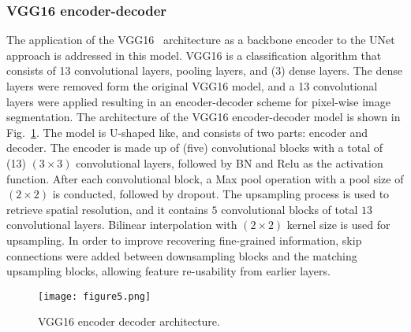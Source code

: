 \subsubsection{VGG16 encoder-decoder}
The application of the VGG16~\cite{Simonyan2015} architecture as a backbone encoder to the UNet~\cite{Ronneberger2015} approach is addressed in this model.
VGG16 is a classification algorithm that consists of 13 convolutional layers, pooling layers, and (3) dense layers.
The dense layers were removed form the original VGG16 model, and a 13 convolutional layers were applied resulting in an encoder-decoder scheme for pixel-wise image segmentation.
The architecture of the VGG16 encoder-decoder model is shown in Fig.~\ref{vgg16}.
The model is U-shaped like, and consists of two parts: encoder and decoder.
The encoder is made up of (five) convolutional blocks with a total of (13) \((3\times3)\) convolutional layers, followed by BN and Relu as the activation function.
After each convolutional block, a Max pool operation with a pool size of \((2\times2)\) is conducted, followed by dropout. 
The upsampling process is used to retrieve spatial resolution, and it contains \(5\) convolutional blocks of total \(13\) convolutional layers.
Bilinear interpolation with \((2\times2)\) kernel size is used for upsampling.
In order to improve recovering fine-grained information, skip connections were added between downsampling blocks and the matching upsampling blocks, allowing feature re-usability from earlier layers.
\begin{figure} [h!]
	\begin{center}
		\texttt{[image: figure5.png]}
	\end{center}
	\caption{VGG16 encoder decoder architecture.} 
	\label{vgg16}
\end{figure}

